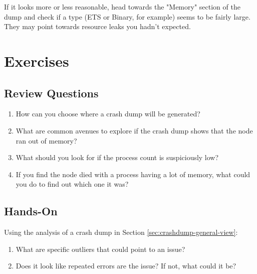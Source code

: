 If it looks more or less reasonable, head towards the "Memory" section of the dump and check if a type (ETS or Binary, for example) seems to be fairly large. They may point towards resource leaks you hadn't expected.


\section{Exercises}

\subsection*{Review Questions}

\begin{enumerate}
	\item How can you choose where a crash dump will be generated?
	\item What are common avenues to explore if the crash dump shows that the node ran out of memory?
	\item What should you look for if the process count is suspiciously low?
	\item If you find the node died with a process having a lot of memory, what could you do to find out which one it was?\end{enumerate}

\subsection*{Hands-On}

Using the analysis of a crash dump in Section \ref{sec:crashdump-general-view}:

\begin{enumerate}
	\item What are specific outliers that could point to an issue?
	\item Does it look like repeated errors are the issue? If not, what could it be? 
\end{enumerate}


